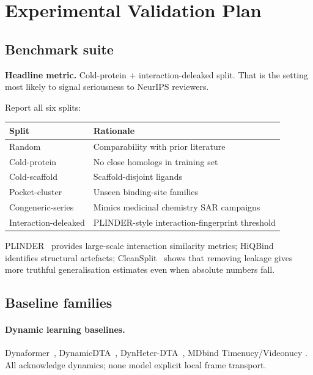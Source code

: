 \documentclass[12pt,a4paper]{article}
\begin{document}
\section{Experimental Validation Plan}
\label{sec:experiments}

\subsection{Benchmark suite}

\begin{claimbox}
\textbf{Headline metric.}
Cold-protein $+$ interaction-deleaked split.
That is the setting most likely to signal seriousness to NeurIPS reviewers.
\end{claimbox}

Report all six splits:

\begin{center}
\begin{tabularx}{0.82\textwidth}{lX}
\toprule
\textbf{Split} & \textbf{Rationale} \\
\midrule
Random & Comparability with prior literature \\
Cold-protein & No close homologs in training set \\
Cold-scaffold & Scaffold-disjoint ligands \\
Pocket-cluster & Unseen binding-site families \\
Congeneric-series & Mimics medicinal chemistry SAR campaigns \\
Interaction-deleaked & PLINDER-style interaction-fingerprint threshold \\
\bottomrule
\end{tabularx}
\end{center}

PLINDER~\citep{plinder2024} provides large-scale interaction similarity
metrics; HiQBind~\citep{hiqbind2025} identifies structural artefacts;
CleanSplit~\citep{cleansplit2025} shows that removing leakage gives
more truthful generalisation estimates even when absolute numbers fall.

\subsection{Baseline families}

\paragraph{Dynamic learning baselines.}
Dynaformer~\citep{dynaformer2024}, DynamicDTA~\citep{dynamicdta2025},
DynHeter-DTA~\citep{dynheterdta2025}, MDbind Timenucy/Videonucy
\citep{mdbind2025}.
All acknowledge dynamics; none model explicit local frame transport.
\end{document}
